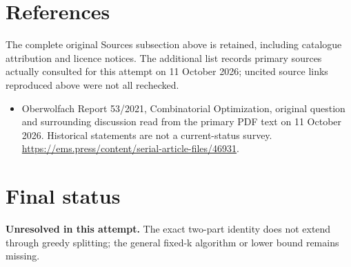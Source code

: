 \documentclass[11pt]{article}
\begin{document}
\section{References}
The complete original Sources subsection above is retained, including catalogue attribution and licence notices. The additional list records primary sources actually consulted for this attempt on 11 October 2026; uncited source links reproduced above were not all rechecked.
\begin{itemize}
\item Oberwolfach Report 53/2021, Combinatorial Optimization, original question and surrounding discussion read from the primary PDF text on 11 October 2026. Historical statements are not a current-status survey. \url{https://ems.press/content/serial-article-files/46931}.
\end{itemize}
\section{Final status}
\textbf{Unresolved in this attempt.} The exact two-part identity does not extend through greedy splitting; the general fixed-k algorithm or lower bound remains missing.
\end{document}
